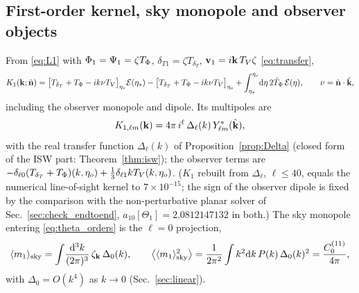 \subsection{First-order kernel, sky monopole and observer objects}
\label{sec:asm-first}
From \eqref{eq:L1} with $\Phi_1=\Psi_1=\zeta T_\Phi$, $\delta_{T1}=\zeta T_{\delta_T}$, $\mathbf v_1=i\mathbf k\,T_V\zeta$ \eqref{eq:transfer},
\begin{equation}
K_1(\mathbf k;\hat{\mathbf n})=\big[T_{\delta_T}+T_\Phi-ik\nu T_V\big]_{\eta_*}\mathcal E(\eta_*)-\big[T_{\delta_T}+T_\Phi-ik\nu T_V\big]_{\eta_o}
+\int_{\eta_*}^{\eta_o}\!\mathrm d\eta\,2\dot T_\Phi\,\mathcal E(\eta),\qquad \nu=\hat{\mathbf n}\cdot\hat{\mathbf k},
\label{eq:asm-K1}
\end{equation}
including the observer monopole and dipole.  Its multipoles are
\begin{equation}
K_{1,\ell m}(\mathbf k)=4\pi\,i^\ell\,\Delta_\ell(k)\,Y^*_{\ell m}(\hat{\mathbf k}),
\label{eq:asm-K1lm}
\end{equation}
with the real transfer function $\Delta_\ell(k)$ of Proposition~\ref{prop:Delta} (closed form of the ISW part:
Theorem~\ref{thm:isw}); the observer terms are $-\delta_{\ell0}(T_{\delta_T}+T_\Phi)(k,\eta_o)+\tfrac13\delta_{\ell1}kT_V(k,\eta_o)$.
($K_1$ rebuilt from $\Delta_\ell$, $\ell\le40$, equals the numerical line-of-sight kernel to $7\times10^{-15}$; the sign of the
observer dipole is fixed by the comparison with the non-perturbative planar solver of Sec.~\ref{sec:check_endtoend}, $a_{10}[\Theta_1]=2.0812147132$ in both.)
The sky monopole entering \eqref{eq:theta_orders} is the $\ell=0$ projection,
\begin{equation}
\langle m_1\rangle_{\rm sky}=\int\!\frac{\mathrm d^3k}{(2\pi)^3}\,\zeta_\mathbf k\,\Delta_0(k),\qquad
\big\langle\langle m_1\rangle_{\rm sky}^2\big\rangle=\frac1{2\pi^2}\int k^2\mathrm d k\,P(k)\,\Delta_0(k)^2=\frac{C^{(11)}_0}{4\pi},
\label{eq:asm-monopole}
\end{equation}
with $\Delta_0=O(k^4)$ as $k\to0$ (Sec.~\ref{sec:linear}).

